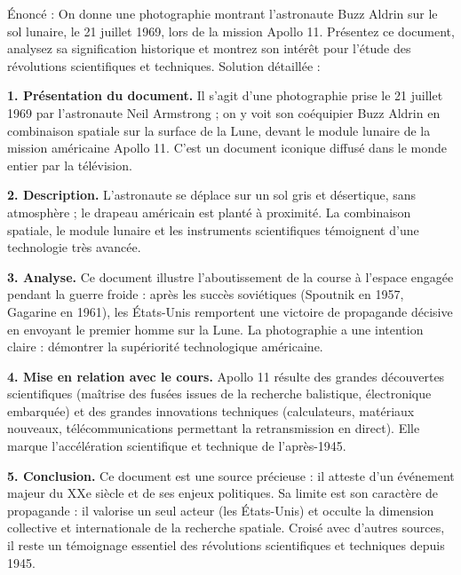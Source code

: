 \documentclass[11pt]{article}
\begin{document}
\begin{exoresolu}
Énoncé : On donne une photographie montrant l'astronaute Buzz Aldrin sur le sol lunaire, le 21 juillet 1969, lors de la mission Apollo 11. Présentez ce document, analysez sa signification historique et montrez son intérêt pour l'étude des révolutions scientifiques et techniques.
\tcblower
Solution détaillée :

\textbf{1. Présentation du document.} Il s'agit d'une photographie prise le 21 juillet 1969 par l'astronaute Neil Armstrong ; on y voit son coéquipier Buzz Aldrin en combinaison spatiale sur la surface de la Lune, devant le module lunaire de la mission américaine Apollo 11. C'est un document iconique diffusé dans le monde entier par la télévision.

\textbf{2. Description.} L'astronaute se déplace sur un sol gris et désertique, sans atmosphère ; le drapeau américain est planté à proximité. La combinaison spatiale, le module lunaire et les instruments scientifiques témoignent d'une technologie très avancée.

\textbf{3. Analyse.} Ce document illustre l'aboutissement de la course à l'espace engagée pendant la guerre froide : après les succès soviétiques (Spoutnik en 1957, Gagarine en 1961), les États-Unis remportent une victoire de propagande décisive en envoyant le premier homme sur la Lune. La photographie a une intention claire : démontrer la supériorité technologique américaine.

\textbf{4. Mise en relation avec le cours.} Apollo 11 résulte des grandes découvertes scientifiques (maîtrise des fusées issues de la recherche balistique, électronique embarquée) et des grandes innovations techniques (calculateurs, matériaux nouveaux, télécommunications permettant la retransmission en direct). Elle marque l'accélération scientifique et technique de l'après-1945.

\textbf{5. Conclusion.} Ce document est une source précieuse : il atteste d'un événement majeur du XXe siècle et de ses enjeux politiques. Sa limite est son caractère de propagande : il valorise un seul acteur (les États-Unis) et occulte la dimension collective et internationale de la recherche spatiale. Croisé avec d'autres sources, il reste un témoignage essentiel des révolutions scientifiques et techniques depuis 1945.
\end{exoresolu}
\end{document}

